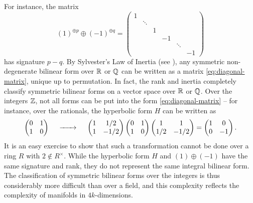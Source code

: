 For instance, the matrix
\begin{equation}\label{eq:diagonal-matrix}
	(1)^{\oplus p}\oplus (-1)^{\oplus q} = \begin{pmatrix}
		1 &        &   &    &             \\
		  & \ddots &   &    &             \\
		  &        & 1 &    &             \\
		  &        &   & -1 &        &    \\
		  &        &   &    & \ddots &    \\
		  &        &   &    &        & -1
	\end{pmatrix}
\end{equation}
has signature $p-q$. By Sylvester's Law of Inertia (see \cite{lam2005quadratic}), any symmetric non-degenerate bilinear form over $\mathbb{R}$ or $\mathbb{Q}$ can be written as a matrix \cref{eq:diagonal-matrix}, unique up to permutation.
In fact, the rank and inertia completely classify symmetric bilinear forms on a vector space over $\mathbb{R}$ or $\mathbb{Q}$. Over the integers $\mathbb{Z}$, not all forms can be put into the form \cref{eq:diagonal-matrix} -- for instance, over the rationals, the hyperbolic form $H$ can be written as
\begin{equation}\label{eq:hyperbolic-form-transformation}
	\begin{pmatrix} 0 & 1\\ 1 & 0 \end{pmatrix}
	\quad\lkxto\quad
	\begin{pmatrix} 1 & 1/2 \\ 1 & -1/2 \end{pmatrix}
	\begin{pmatrix} 0 & 1 \\ 1 & 0 \end{pmatrix}
	\begin{pmatrix} 1 & 1 \\ 1/2 & -1/2 \end{pmatrix}=
	\begin{pmatrix} 1 & 0 \\ 0 & -1 \end{pmatrix}.
\end{equation}
It is an easy exercise to show that such a transformation cannot be done over a ring $R$ with $2\not\in R^\times$. While the hyperbolic form $H$ and $(1)\oplus (-1)$ have the same signature and rank, they do not represent the same integral bilinear form.
The classification of symmetric bilinear forms over the integers is thus considerably more difficult than over a field, and this complexity reflects the complexity of manifolds in $4k$-dimensions.

